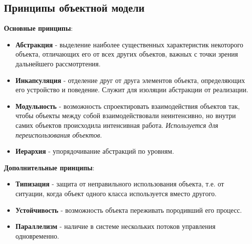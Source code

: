 \subsection{Принципы объектной модели}
\textbf{Основные принципы}:
\begin{itemize}
    \item \begin{definition}\textbf{Абстракция} - выделение наиболее существенных характеристик некоторого объекта, отличающих его от всех других объектов, важных с точки зрения дальнейшего рассмотртения.\end{definition}
    \item \begin{definition}\textbf{Инкапсуляция} - отделение друг от друга элементов объекта, определяющих его устройство и поведение. Служит для изоляции абстракции от реализации.\end{definition} 
    \item \begin{definition}\textbf{Модульность} - возможность спроектировать взаимодействия объектов так, чтобы объекты между собой взаимодействовали неинтенсивно, но внутри самих объектов происходила интенсивная работа. \textit{Используется для переиспользования объектов}.\end{definition}
    \item \begin{definition}\textbf{Иерархия} - упорядочивание абстракций по уровням.\end{definition}
\end{itemize}

\textbf{Дополнительные принципы}:
\begin{itemize}
    \item \begin{definition}\textbf{Типизация} - защита от неправильного использования объекта, т.е. от ситуации, когда объект одного класса используется вместо другого.\end{definition}
    \item \begin{definition}\textbf{Устойчивость} - возможность объекта переживать породивший его процесс.\end{definition}
    \item \begin{definition}\textbf{Параллелизм} - наличие в системе нескольких потоков управления одновременно.\end{definition}
\end{itemize}

